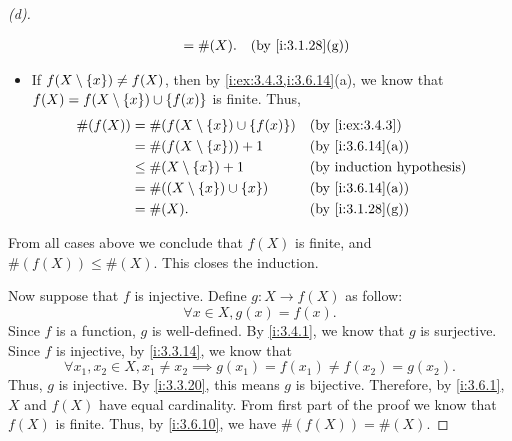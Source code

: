\begin{proof}[(d)]
\begin{itemize}
\begin{align*}
                     & = \#(X).                                 &  & \by{i:3.1.28}[g]
          \end{align*}
    \item If \(f(X \setminus \left\lbrace x\right\rbrace) \neq f(X)\), then by \cref{i:ex:3.4.3,i:3.6.14}(a), we know that \(f(X) = f(X \setminus \left\lbrace x\right\rbrace) \cup \left\lbrace f(x)\right\rbrace\) is finite.
          Thus,
          \begin{align*}
            \#(f(X)) & = \#(f(X \setminus \set{x}) \cup \set{f(x)}) &  & \by{i:ex:3.4.3}  \\
                     & = \#(f(X \setminus \set{x})) + 1             &  & \by{i:3.6.14}[a] \\
                     & \leq \#(X \setminus \set{x}) + 1             &  & \byIH            \\
                     & = \#((X \setminus \set{x}) \cup \set{x})     &  & \by{i:3.6.14}[a] \\
                     & = \#(X).                                     &  & \by{i:3.1.28}[g]
          \end{align*}
  \end{itemize}
  From all cases above we conclude that \(f(X)\) is finite, and \(\#(f(X)) \leq \#(X)\).
  This closes the induction.

  Now suppose that \(f\) is injective.
  Define \(g : X \to f(X)\) as follow:
  \[
    \forall x \in X, g(x) = f(x).
  \]
  Since \(f\) is a function, \(g\) is well-defined.
  By \cref{i:3.4.1}, we know that \(g\) is surjective.
  Since \(f\) is injective, by \cref{i:3.3.14}, we know that
  \[
    \forall x_1, x_2 \in X, x_1 \neq x_2 \implies g(x_1) = f(x_1) \neq f(x_2) = g(x_2).
  \]
  Thus, \(g\) is injective.
  By \cref{i:3.3.20}, this means \(g\) is bijective.
  Therefore, by \cref{i:3.6.1}, \(X\) and \(f(X)\) have equal cardinality.
  From first part of the proof we know that \(f(X)\) is finite.
  Thus, by \cref{i:3.6.10}, we have \(\#(f(X)) = \#(X)\).
\end{proof}


